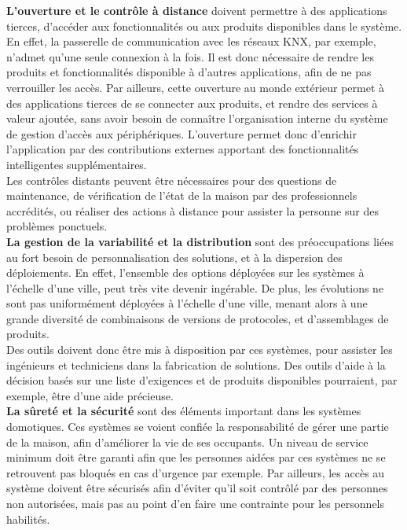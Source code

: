 {\bf L'ouverture et le contrôle à distance} doivent permettre à des applications tierces, d'accéder aux fonctionnalités ou aux produits disponibles dans le système. En effet, la passerelle de communication avec les réseaux KNX, par exemple, n'admet qu'une seule connexion à la fois. Il est donc nécessaire de rendre les produits et fonctionnalités disponible à d'autres applications, afin de ne pas verrouiller les accès. Par ailleurs, cette ouverture au monde extérieur permet à des applications tierces de se connecter aux produits, et rendre des services à valeur ajoutée, sans avoir besoin de connaître l'organisation interne du système de gestion d'accès aux périphériques. L'ouverture permet donc d'enrichir l'application par des contributions externes apportant des fonctionnalités intelligentes supplémentaires.\\
Les contrôles distants peuvent être nécessaires pour des questions de maintenance, de vérification de l'état de la maison par des professionnels accrédités, ou réaliser des actions à distance pour assister la personne sur des problèmes ponctuels.\\

{\bf La gestion de la variabilité et la distribution} sont des préoccupations liées au fort besoin de personnalisation des solutions, et à la dispersion des déploiements. En effet, l'ensemble des options déployées sur les systèmes à l'échelle d'une ville, peut très vite devenir ingérable. De plus, les évolutions ne sont pas uniformément déployées à l'échelle d'une ville, menant alors à une grande diversité de combinaisons de versions de protocoles, et d'assemblages de produits.\\
Des outils doivent donc être mis à disposition par ces systèmes, pour assister les ingénieurs et techniciens dans la fabrication de solutions. Des outils d'aide à la décision basés sur une liste d'exigences et de produits disponibles pourraient, par exemple, être d'une aide précieuse.\\

{\bf La sûreté et la sécurité} sont des éléments important dans les systèmes domotiques. Ces systèmes se voient confiée la responsabilité de gérer une partie de la maison, afin d'améliorer la vie de ses occupants. Un niveau de service minimum doit être garanti afin que les personnes aidées par ces systèmes ne se retrouvent pas bloqués en cas d'urgence par exemple. Par ailleurs, les accès au système doivent être sécurisés afin d'éviter qu'il soit contrôlé par des personnes non autorisées, mais pas au point d'en faire une contrainte pour les personnels habilités.\\

